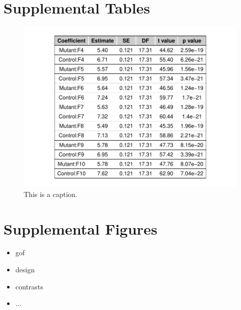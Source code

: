 \documentclass[11pt]{elife}\usepackage[]{graphicx}\usepackage[]{color}
\makeatletter
\def\maxwidth{ %
  \ifdim\Gin@nat@width>\linewidth
    \linewidth
  \else
    \Gin@nat@width
  \fi
}
\newenvironment{knitrout}{}{} %
\makeatother
\begin{document}
\newpage





\newpage

\section{Supplemental Tables}

\begin{figure}
\begin{knitrout}
\color{fgcolor}

{\centering \includegraphics[width=\maxwidth]{figure/tab0-1} 

}



\end{knitrout}
	\caption{This is a caption.}
	\label{fig:tab0}
\end{figure}

\newpage


\section{Supplemental Figures}

\begin{itemize}
	\item gof
	\item design
	\item contrasts
	\item ...
\end{itemize}

\newpage


\end{document}
